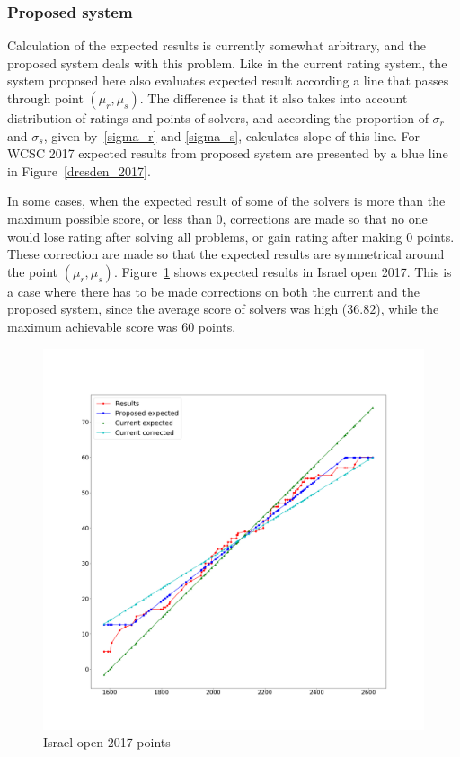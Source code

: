 \documentclass[preprint,12pt]{article}
\begin{document}
\subsubsection{Proposed system}

Calculation of the expected results is currently somewhat arbitrary,
and the proposed system deals with this problem.
Like in the current rating system, the system proposed here
also evaluates expected result according
a line that passes through point $(\mu_r, \mu_s)$.
The difference is that it also takes into account distribution of
ratings and points of solvers, and according the proportion of
$\sigma_r$ and $\sigma_s$, given by~\eqref{sigma_r} and \eqref{sigma_s},
calculates slope of this line.
For WCSC 2017 expected results from proposed system
are presented by a blue line in Figure~\ref{dresden_2017}.

In some cases, when the expected result of some of the solvers is
more than the maximum possible score, or less than $0$,
corrections are made so that no one would lose rating
after solving all problems, or gain rating after making $0$ points.
These correction are made so that the expected results are symmetrical
around the point $(\mu_r, \mu_s)$.
Figure~\ref{israel_2017} shows expected results in Israel open 2017.
This is a case where there has to be made corrections on both the current
and the proposed system, since the average score of solvers was high ($36.82$),
while the maximum achievable score was $60$ points.

\begin{figure}[h]
\includegraphics[width=1.0\linewidth]
{Israel_2017_points}\caption{Israel open 2017 points}
\label{israel_2017}
\end{figure}
\end{document}
